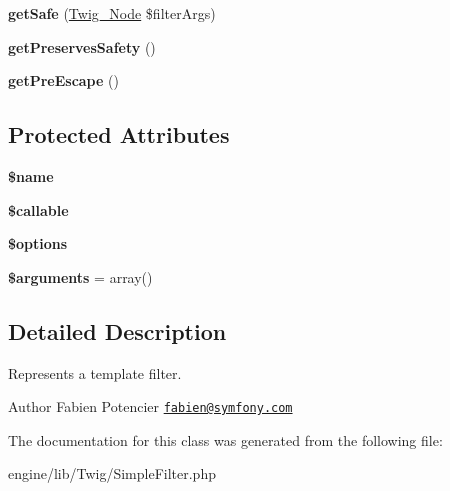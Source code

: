 \begin{DoxyCompactItemize}
\item 
\hypertarget{class_twig___simple_filter_acc5701ec146ba15919020bbc42941632}{}{\bfseries get\+Safe} (\hyperlink{class_twig___node}{Twig\+\_\+\+Node} \$filter\+Args)\label{class_twig___simple_filter_acc5701ec146ba15919020bbc42941632}

\item 
\hypertarget{class_twig___simple_filter_a7fc1becef9ade703f0c381e579d5a879}{}{\bfseries get\+Preserves\+Safety} ()\label{class_twig___simple_filter_a7fc1becef9ade703f0c381e579d5a879}

\item 
\hypertarget{class_twig___simple_filter_a4b7863ed7e994206f25a6c84cbc59116}{}{\bfseries get\+Pre\+Escape} ()\label{class_twig___simple_filter_a4b7863ed7e994206f25a6c84cbc59116}

\end{DoxyCompactItemize}
\subsection*{Protected Attributes}
\begin{DoxyCompactItemize}
\item 
\hypertarget{class_twig___simple_filter_ab2fc40d43824ea3e1ce5d86dee0d763b}{}{\bfseries \$name}\label{class_twig___simple_filter_ab2fc40d43824ea3e1ce5d86dee0d763b}

\item 
\hypertarget{class_twig___simple_filter_ae3d0fc9fa800751a4a5e2917209d85f2}{}{\bfseries \$callable}\label{class_twig___simple_filter_ae3d0fc9fa800751a4a5e2917209d85f2}

\item 
\hypertarget{class_twig___simple_filter_a011800c63ece4cbbfa77136a20607023}{}{\bfseries \$options}\label{class_twig___simple_filter_a011800c63ece4cbbfa77136a20607023}

\item 
\hypertarget{class_twig___simple_filter_a61eded163d962fc248b3cf209000979b}{}{\bfseries \$arguments} = array()\label{class_twig___simple_filter_a61eded163d962fc248b3cf209000979b}

\end{DoxyCompactItemize}


\subsection{Detailed Description}
Represents a template filter.

\begin{DoxyAuthor}{Author}
Fabien Potencier \href{mailto:fabien@symfony.com}{\tt fabien@symfony.\+com} 
\end{DoxyAuthor}


The documentation for this class was generated from the following file\+:\begin{DoxyCompactItemize}
\item 
engine/lib/\+Twig/Simple\+Filter.\+php\end{DoxyCompactItemize}
